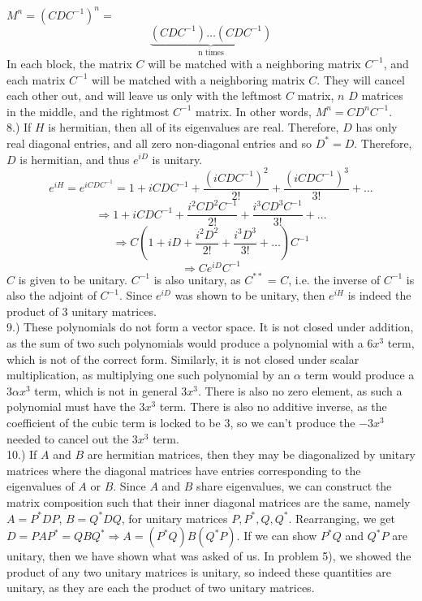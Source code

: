 \documentclass[12pt]{article}
\begin{document}
$M^n = (CDC^{-1})^n = $ \[ \underbrace{(CDC^{-1}) \dots (CDC^{-1})}_{\text{n times}} \]
In each block, the matrix $C$ will be matched with a neighboring matrix $C^{-1}$, and each matrix $C^{-1}$ will be matched with a neighboring matrix $C$. They will cancel each other out, and will leave us only with the leftmost $C$ matrix, $n$ $D$ matrices in the middle, and the rightmost $C^{-1}$ matrix. In other words, $M^{n} = CD^{n}C^{-1}$.\\

8.) If $H$ is hermitian, then all of its eigenvalues are real. Therefore, $D$ has only real diagonal entries, and all zero non-diagonal entries and so $D^* = D$. Therefore, $D$ is hermitian, and thus $e^{iD}$ is unitary.
$$e^{iH} = e^{iCDC^{-1}} = 1 + iCDC^{-1} + \frac{(iCDC^{-1})^2}{2!} + \frac{(iCDC^{-1})^3}{3!} + \dots$$
$$\Rightarrow 1 + iCDC^{-1} + \frac{i^2CD^2C^{-1}}{2!} + \frac{i^3CD^3C^{-1}}{3!} + \dots$$
$$\Rightarrow C(1 + iD + \frac{i^2D^2}{2!} + \frac{i^3D^3}{3!} + \dots)C^{-1}$$
$$\Rightarrow Ce^{iD}C^{-1}$$
$C$ is given to be unitary. $C^{-1}$ is also unitary, as $C^{**}$ = $C$, i.e. the inverse of $C^{-1}$ is also  the adjoint of $C^{-1}$. Since $e^{iD}$ was shown to be unitary, then $e^{iH}$ is indeed the product of $3$ unitary matrices.\\

9.) These polynomials do not form a vector space. It is not closed under addition, as the sum of two such polynomials would produce a polynomial with a $6x^3$ term, which is not of the correct form. Similarly, it is not closed under scalar multiplication, as multiplying one such polynomial by an $\alpha$ term would produce a $3 \alpha x^3$ term, which is not in general $3x^3$. There is also no zero element, as such a polynomial must have the $3x^3$ term. There is also no additive inverse, as the coefficient of the cubic term is locked to be $3$, so we can't produce the $-3x^3$ needed to cancel out the $3x^3$ term.\\

10.) If $A$ and $B$ are hermitian matrices, then they may be diagonalized by unitary matrices where the diagonal matrices have entries corresponding to the eigenvalues of $A$ or $B$. Since $A$ and $B$ share eigenvalues, we can construct the matrix composition such that their inner diagonal matrices are the same, namely $A = P^*DP$, $B = Q^*DQ$, for unitary matrices $P, P^*, Q, Q^*$. Rearranging, we get $D = PAP^* = QBQ^* \Rightarrow A = (P^*Q)B(Q^*P)$. If we can show $P^*Q$ and $Q^*P$ are unitary, then we have shown what was asked of us. In problem 5), we showed the product of any two unitary matrices is unitary, so indeed these quantities are unitary, as they are each the product of two unitary matrices.
\end{document}
